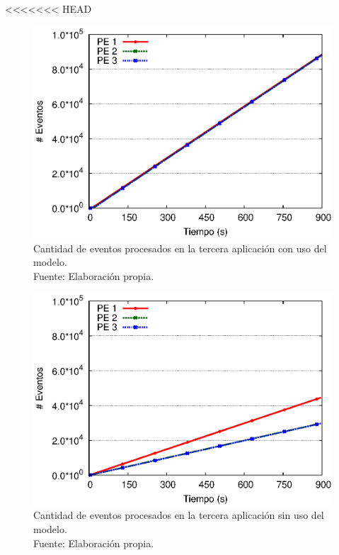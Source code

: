 <<<<<<< HEAD
\begin{figure}[!ht]
	\centering
	\captionsetup{justification=centering}
    \includegraphics[scale=0.75]{images/exp/app3/cm/logical/eventCount.eps}
    \caption[Cantidad de eventos procesados en la tercera aplicación con uso del modelo.]{Cantidad de eventos procesados en la tercera aplicación con uso del modelo.\\Fuente: Elaboración propia.}
    \label{fig:app3-eventCount-cm}
\end{figure}

\begin{figure}[!ht]
	\centering
	\captionsetup{justification=centering}
    \includegraphics[scale=0.75]{images/exp/app3/sm/logical/eventCount.eps}
    \caption[Cantidad de eventos procesados en la tercera aplicación sin uso del modelo.]{Cantidad de eventos procesados en la tercera aplicación sin uso del modelo.\\Fuente: Elaboración propia.}
    \label{fig:app3-eventCount-sm}
\end{figure}

